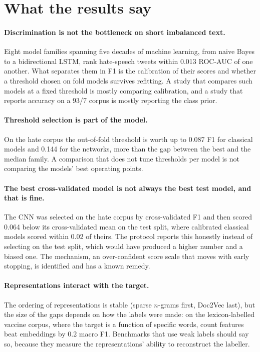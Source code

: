 \section{What the results say}
\paragraph{Discrimination is not the bottleneck on short imbalanced text.} Eight model families spanning five decades of machine learning, from naive Bayes to a bidirectional LSTM, rank hate-speech tweets within 0.013 ROC-AUC of one another. What separates them in F1 is the calibration of their scores and whether a threshold chosen on fold models survives refitting. A study that compares such models at a fixed threshold is mostly comparing calibration, and a study that reports accuracy on a 93/7 corpus is mostly reporting the class prior.

\paragraph{Threshold selection is part of the model.} On the hate corpus the out-of-fold threshold is worth up to 0.087 F1 for classical models and 0.144 for the networks, more than the gap between the best and the median family. A comparison that does not tune thresholds per model is not comparing the models' best operating points.

\paragraph{The best cross-validated model is not always the best test model, and that is fine.} The CNN was selected on the hate corpus by cross-validated F1 and then scored 0.064 below its cross-validated mean on the test split, where calibrated classical models scored within 0.02 of theirs. The protocol reports this honestly instead of selecting on the test split, which would have produced a higher number and a biased one. The mechanism, an over-confident score scale that moves with early stopping, is identified and has a known remedy.

\paragraph{Representations interact with the target.} The ordering of representations is stable (sparse $n$-grams first, Doc2Vec last), but the size of the gaps depends on how the labels were made: on the lexicon-labelled vaccine corpus, where the target is a function of specific words, count features beat embeddings by 0.2 macro F1. Benchmarks that use weak labels should say so, because they measure the representations' ability to reconstruct the labeller.

